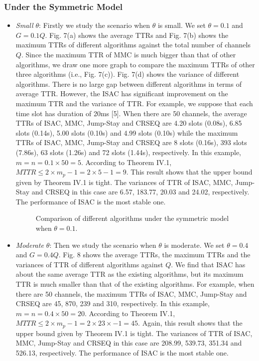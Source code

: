 \documentclass[journal]{IEEEtran}
\begin{document}
\subsubsection{Under the Symmetric Model}
\begin{itemize}
\item\emph{Small $\theta$}: Firstly we study the scenario when $\theta$ is small. We set $\theta=0.1$ and $G=0.1Q$. Fig. 7(a) shows the average TTRs and Fig. 7(b) shows the maximum TTRs of different algorithms against the total number of channels $Q$. Since the maximum TTR of MMC is much bigger than that of other algorithms, we draw one more graph to compare the maximum TTRs of other three algorithms (i.e., Fig. 7(c)). Fig. 7(d) shows the variance of different algorithms. There is no large gap between different algorithms in terms of average TTR. However, the ISAC has significant improvement on the maximum TTR and the variance of TTR. For example, we suppose that each time slot has duration of 20ms [5]. When there are 50 channels, the average TTRs of ISAC, MMC, Jump-Stay and CRSEQ are 4.20 slots (0.08s), 6.85 slots (0.14s), 5.00 slots (0.10s) and 4.99 slots (0.10s) while the maximum TTRs of ISAC, MMC, Jump-Stay and CRSEQ are 8 slots (0.16s), 393 slots (7.86s), 63 slots (1.26s) and 72 slots (1.44s), respectively. In this example, $m=n=0.1\times50=5$. According to Theorem IV.1, $MTTR\leq 2\times m_p-1=2\times5-1=9$. This result shows that the upper bound given by Theorem IV.1 is tight. The variances of TTR of ISAC, MMC, Jump-Stay and CRSEQ in this case are 6.57, 183.77, 20.03 and 24.02, respectively. The performance of ISAC is the most stable one.
\begin{figure}
\centering
{}
\hspace{1in}
\hspace{1in}
\hspace{1in}
\caption{Comparison of different algorithms under the symmetric model when $\theta=0.1$.}
\end{figure}
\item \emph{Moderate $\theta$}: Then we study the scenario when $\theta$ is moderate. We set $\theta=0.4$ and $G=0.4Q$. Fig. 8 shows the average TTRs, the maximum TTRs and the variances of TTR of different algorithms against $Q$. We find that ISAC has about the same average TTR as the existing algorithms, but its maximum TTR is much smaller than that of the existing algorithms. For example, when there are 50 channels, the maximum TTRs of ISAC, MMC, Jump-Stay and CRSEQ are 45, 870, 239 and 310, respectively. In this example, $m=n=0.4\times50=20$. According to Theorem IV.1, $MTTR\leq 2\times m_p-1=2\times 23\times-1=45$. Again, this result shows that the upper bound given by Theorem IV.1 is tight. The variances of TTR of ISAC, MMC, Jump-Stay and CRSEQ in this case are 208.99, 539.73, 351.34 and 526.13, respectively. The performance of ISAC is the most stable one.

\end{itemize}
\end{document}
